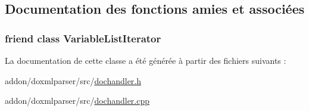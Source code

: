 \subsection{Documentation des fonctions amies et associées}
\hypertarget{class_variable_list_handler_a8c090f1bc8d2b072a4be8ce5b4571421}{}
\subsubsection[{Variable\+List\+Iterator}]{\setlength{\rightskip}{0pt plus 5cm}friend class {\bf Variable\+List\+Iterator}\hspace{0.3cm}{\ttfamily [friend]}}\label{class_variable_list_handler_a8c090f1bc8d2b072a4be8ce5b4571421}


La documentation de cette classe a été générée à partir des fichiers suivants \+:\begin{DoxyCompactItemize}
\item 
addon/doxmlparser/src/\hyperlink{dochandler_8h}{dochandler.\+h}\item 
addon/doxmlparser/src/\hyperlink{dochandler_8cpp}{dochandler.\+cpp}\end{DoxyCompactItemize}
